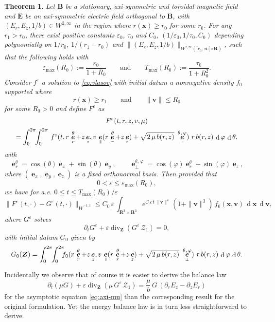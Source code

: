 \documentclass[JEP,XML,SOM,Unicode]{cedram}
\let\mathcal\mathscr
\newcommand{\sperp}{{\scriptscriptstyle\perp}}
\let\eps\varepsilon
\let\d\partial
\DeclareMathOperator\dD{d}\let\dd\dD
\DeclareMathOperator{\Div}{div}
\theoremstyle{plain}
\newtheorem{theorem}{Theorem}[section]
\theoremstyle{definition}
\newcommand{\be}{\begin{equation}}
\newcommand{\ee}{\end{equation}}
\newcommand{\bt}{\begin{theorem}}
\newcommand{\et}{\end{theorem}}
\newcommand\R{\mathbf R}
\newcommand\bB{{\boldsymbol B}}
\newcommand\bE{{\boldsymbol E}}
\newcommand\bfv{{\boldsymbol v}}
\newcommand\bfx{{\boldsymbol x}}
\newcommand\bfZ{{\boldsymbol Z}}
\newcommand\cZ{{\mathcal Z}}
\DeclareMathOperator{\beD}{\boldsymbol{e}}
\newcommand\eDx{\beD_x}
\newcommand\eDy{\beD_y}
\newcommand\eDr{\beD_r}
\newcommand\eDz{\beD_z}
\newcommand\eDpar{\beD_\mypar}
\newcommand\eDperp{\beD_\sperp}
\newcommand\Er{E_r}
\newcommand\Ez{E_z}
\newcommand{\mypar}{{\mkern3mu\vphantom{\perp}\vrule depth 0pt\mkern2mu\vrule depth 0pt\mkern3mu}}
\begin{document}
\bt
\label{th:3-mu}
Let $\bB$ be a stationary, axi-symmetric and toroidal magnetic field and $\bE$ be
an axi-symmetric electric field orthogonal to $\bB$, with $(\Er,\Ez,1/b)\in
W^{2,\infty}$ in the region where $r(\bfx)\geq r_0$ for some
$r_0$. For any $r_1>r_0$, there exist positive constants $\eps_0$, $\tau_0$ and $C_0$, $(1/\eps_0,1/\tau_0,C_0)$ depending polynomially on $1/r_0$, $1/(r_1-r_0)$ and $\|(\Er,\Ez,1/b)\|_{W^{2,\infty}([r_0,\infty[\times\R)}$, such that the following holds with
\[
\eps_{\max}(R_0):=\frac{\eps_0}{1+R_0}\qquad\textrm{and}\qquad
T_{\max}(R_0):=\frac{\tau_0}{1+R_0^2}.
\]
Consider $f^\eps$ a solution to \eqref{eq:vlasov} with initial datum a nonnegative density $f_0$ supported where
\[
r(\bfx)\geq r_1\qquad\textrm{and}\qquad \|\bfv\|\leq R_0
\]
for some $R_0>0$ and define $F^\eps$ as
\begin{multline*}
F^\eps(t,r,z,v,\mu)\\
=\int_0^{2\pi}\!\!\int_0^{2\pi}
\,f^\eps(t,r\,\eDr^\theta+z\eDz,
v\,\eDpar(r\,\eDr^\theta+z\eDz)
+\sqrt{2\,\mu\,b(r,z)}\ \eDperp^{\theta,\,\varphi})\ r\,b(r,z)\,\dD \varphi\,\dD\theta,
\end{multline*}
with
\[
\eDr^\theta=\cos(\theta)\eDx+\sin(\theta)\eDy,\qquad
\eDperp^{\theta,\,\varphi}=\cos(\varphi)\eDr^\theta+\sin(\varphi)\eDz,
\]
where $(\eDx,\eDy,\eDz)$ is a fixed orthonormal basis. Then provided that
\[
0<\eps\leq \eps_{\max}(R_0),
\]
we have for a.e. $0\leq t \leq T_{\max}(R_0)/\eps$
\[
\|F^\eps(t,\cdot)-G^\eps(t,\cdot)\|_{\dot{W}^{-1,1}}\leq C_0\,\eps\,
\int_{\R^3\times\R^3} e^{C\,\eps\,t\,\|\bfv\|^4}\,(1+\|\bfv\|^3)\,f_0(\bfx,\bfv)\,\dD\bfx\,\dD\bfv,
\]
where $G^\eps$ solves
\be\label{eq:axi-mu}
\d_t G^\eps+\eps\Div_{\bfZ} \left(G^\eps\,\cZ_1\right)
=0,
\ee
with initial datum $G_0$ given by
\[
G_0(\bfZ)= \int_0^{2\pi}\!\!\int_0^{2\pi}
\hspace*{-2mm}f_0(r\,\eDr^\theta+z\eDz,
v\,\eDpar(r\,\eDr^\theta+z\eDz)
+\sqrt{2\,\mu\,b(r,z)}\ \eDperp^{\theta,\,\varphi})\ r\,b(r,z)\,\dD \varphi\,\dD\theta.
\]
\et

Incidentally we observe that of course it is easier to derive the balance law
\[
\d_t(\mu G)+\eps\Div_{\bfZ} \left(\mu\,G^\eps\,\cZ_1\right)
=\frac{\mu}{b}\,G\,\left(\d_r\Ez-\d_z\Er\right)
\]
for the asymptotic equation \eqref{eq:axi-mu} than the corresponding result for the original formulation. Yet the energy balance law is in turn less straightforward to derive.
\end{document}
